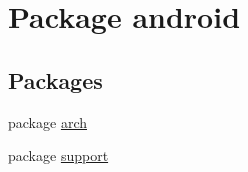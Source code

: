 \hypertarget{namespaceandroid}{}\section{Package android}
\label{namespaceandroid}
\subsection*{Packages}
\begin{DoxyCompactItemize}
\item 
package \mbox{\hyperlink{namespaceandroid_1_1arch}{arch}}
\item 
package \mbox{\hyperlink{namespaceandroid_1_1support}{support}}
\end{DoxyCompactItemize}

